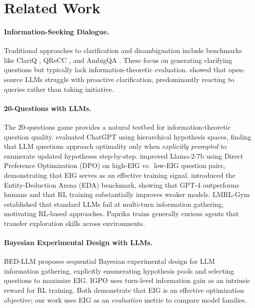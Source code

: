 \documentclass[11pt]{article}
\begin{document}
\section{Related Work}
\label{sec:related}

\paragraph{Information-Seeking Dialogue.}
Traditional approaches to clarification and disambiguation include benchmarks like ClariQ \citep{aliannejadi2021building}, QReCC \citep{anantha2021open}, and AmbigQA \citep{min2020ambigqa}. These focus on generating clarifying questions but typically lack information-theoretic evaluation. \citet{deng2023prompting} showed that open-source LLMs struggle with proactive clarification, predominantly reacting to queries rather than taking initiative.

\paragraph{20-Questions with LLMs.}
The 20-questions game provides a natural testbed for information-theoretic question quality. \citet{bertolazzi2023lets} evaluated ChatGPT using hierarchical hypothesis spaces, finding that LLM questions approach optimality only when \emph{explicitly prompted} to enumerate updated hypotheses step-by-step. \citet{mazzaccara2024learning} improved Llama-2-7b using Direct Preference Optimization (DPO) on high-EIG vs.\ low-EIG question pairs, demonstrating that EIG serves as an effective training signal. \citet{zhang2024eda} introduced the Entity-Deduction Arena (EDA) benchmark, showing that GPT-4 outperforms humans and that RL training substantially improves weaker models. LMRL-Gym \citep{abdulhai2023lmrl} established that standard LLMs fail at multi-turn information gathering, motivating RL-based approaches. Paprika \citep{tajwar2025paprika} trains generally curious agents that transfer exploration skills across environments.

\paragraph{Bayesian Experimental Design with LLMs.}
BED-LLM \citep{choudhury2025bedllm} proposes sequential Bayesian experimental design for LLM information gathering, explicitly enumerating hypothesis pools and selecting questions to maximize EIG. IGPO \citep{wang2025igpo} uses turn-level information gain as an intrinsic reward for RL training. Both demonstrate that EIG is an effective optimization objective; our work uses EIG as an \emph{evaluation} metric to compare model families.
\end{document}
